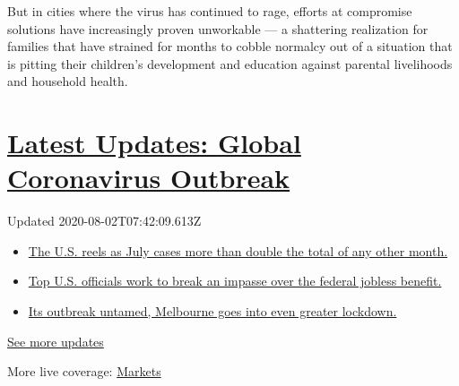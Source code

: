 But in cities where the virus has continued to rage, efforts at
compromise solutions have increasingly proven unworkable --- a
shattering realization for families that have strained for months to
cobble normalcy out of a situation that is pitting their children's
development and education against parental livelihoods and household
health.

\hypertarget{latest-updates-global-coronavirus-outbreak}{%
\section{\texorpdfstring{\href{https://www.nytimes.com/2020/08/01/world/coronavirus-covid-19.html?action=click\&pgtype=Article\&state=default\&region=MAIN_CONTENT_1\&context=storylines_live_updates}{Latest
Updates: Global Coronavirus
Outbreak}}{Latest Updates: Global Coronavirus Outbreak}}\label{latest-updates-global-coronavirus-outbreak}}

Updated 2020-08-02T07:42:09.613Z

\begin{itemize}
\tightlist
\item
  \href{https://www.nytimes.com/2020/08/01/world/coronavirus-covid-19.html?action=click\&pgtype=Article\&state=default\&region=MAIN_CONTENT_1\&context=storylines_live_updates\#link-34047410}{The
  U.S. reels as July cases more than double the total of any other
  month.}
\item
  \href{https://www.nytimes.com/2020/08/01/world/coronavirus-covid-19.html?action=click\&pgtype=Article\&state=default\&region=MAIN_CONTENT_1\&context=storylines_live_updates\#link-780ec966}{Top
  U.S. officials work to break an impasse over the federal jobless
  benefit.}
\item
  \href{https://www.nytimes.com/2020/08/01/world/coronavirus-covid-19.html?action=click\&pgtype=Article\&state=default\&region=MAIN_CONTENT_1\&context=storylines_live_updates\#link-2bc8948}{Its
  outbreak untamed, Melbourne goes into even greater lockdown.}
\end{itemize}

\href{https://www.nytimes.com/2020/08/01/world/coronavirus-covid-19.html?action=click\&pgtype=Article\&state=default\&region=MAIN_CONTENT_1\&context=storylines_live_updates}{See
more updates}

More live coverage:
\href{https://www.nytimes.com/live/2020/07/31/business/stock-market-today-coronavirus?action=click\&pgtype=Article\&state=default\&region=MAIN_CONTENT_1\&context=storylines_live_updates}{Markets}

